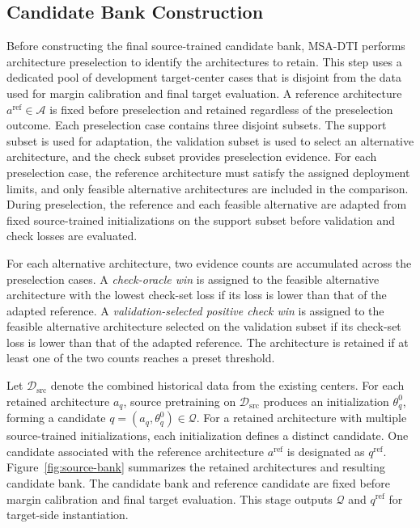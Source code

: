 \documentclass[a4paper,fleqn]{cas-sc}
\begin{document}
\subsection{Candidate Bank Construction}

Before constructing the final source-trained candidate bank, MSA-DTI performs
architecture preselection to identify the architectures to retain. This step uses a
dedicated pool of development target-center cases that is disjoint from the
data used for margin calibration and final target evaluation. A reference
architecture $a^{\mathrm{ref}}\in\mathcal{A}$ is fixed before preselection
and retained regardless of the preselection outcome. Each preselection case
contains three disjoint subsets. The support subset is used for adaptation, the
validation subset is used to select an alternative architecture, and the check
subset provides preselection evidence. For
each preselection case, the reference architecture must satisfy the assigned
deployment limits, and only feasible alternative architectures are included in
the comparison. During preselection, the reference and each feasible
alternative are adapted from fixed source-trained initializations on the
support subset before validation and check losses are evaluated.

For each alternative architecture, two evidence counts are accumulated across
the preselection cases. A \emph{check-oracle win} is assigned to the feasible
alternative architecture with the lowest check-set loss if its loss is lower
than that of the adapted reference. A
\emph{validation-selected positive check win} is assigned to the feasible
alternative architecture selected on the validation subset if its check-set
loss is lower than that of the adapted reference. The architecture is retained
if at least one of the two counts reaches a preset threshold.

Let $\mathcal{D}_{\mathrm{src}}$ denote the combined historical data from the
existing centers. For each retained architecture $a_q$, source pretraining on
$\mathcal{D}_{\mathrm{src}}$ produces an initialization $\theta_q^0$, forming
a candidate $q=(a_q,\theta_q^0)\in\mathcal{Q}$. For a retained architecture
with multiple source-trained initializations, each initialization defines a
distinct candidate. One candidate associated with the reference architecture
$a^{\mathrm{ref}}$ is designated as $q^{\mathrm{ref}}$.
Figure~\ref{fig:source-bank} summarizes the retained architectures and
resulting candidate bank. The candidate bank and reference candidate are fixed
before margin calibration and final target evaluation. This stage outputs
$\mathcal{Q}$ and $q^{\mathrm{ref}}$ for target-side instantiation.
\end{document}
